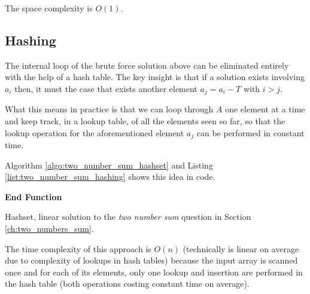 The space complexity is $O(1)$.



\subsection{Hashing}
\label{sec:two_numbers:hashing}
The internal loop of the brute force solution above can be eliminated entirely with the help of a hash table.
The key insight is that if a solution exists involving $a_i$ then, it must the case that exists another element $a_j  = a_i-T$ with $i > j$. 

What this means in practice is that we can loop through $A$ one element at a time and keep track, in a lookup table, of all the elements seen so far, so that the lookup operation for the aforementioned element $a_j$ can be performed in constant time.

Algorithm \ref{algo:two_number_sum_hashset} and Listing \ref{list:two_number_sum_hashing} shows this idea in code.

\begin{algorithm}
	   
	
    \textbf{End Function}

		\caption{Hashset, linear solution to the \textit{two number sum} question in Section
		\ref{ch:two_numbers_sum}.}
		\label{algo:two_number_sum_hashset}
\end{algorithm}




The time complexity of this approach is $O(n)$ (technically is linear on average due to complexity of lookups in hash tables) because the input array is scanned once and for each
of its elements, only one lookup and insertion are performed in the hash table (both operations costing constant time on average).

